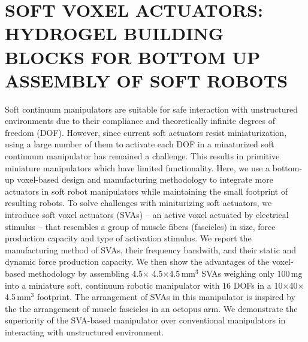 \graphicspath{{Images/SVAs/}}

\chapter{SOFT VOXEL ACTUATORS: HYDROGEL BUILDING BLOCKS FOR BOTTOM UP ASSEMBLY OF SOFT ROBOTS}
\label{chap:SVAs}
Soft continuum manipulators are suitable for safe interaction with unstructured environments due to their compliance and theoretically infinite degrees of freedom (DOF). However, since current soft actuators resist miniaturization, using a large number of them to activate each DOF in a minaturized soft continuum manipulator has remained a challenge. This results in primitive miniature manipulators which have limited functionality. Here, we use a bottom-up voxel-based design and manufacturing methodology to integrate more actuators in soft robot manipulators while maintaining the small footprint of resulting robots. To solve challenges with miniturizing soft actuators, we introduce soft voxel actuators (SVAs) -- an active voxel actuated by electrical stimulus -- that resembles a group of muscle fibers (fascicles) in size, force production capacity and type of activation stimulus. We report the manufacturing method of SVAs, their frequency bandwith, and their static and dynamic force production capacity. We then show the advantages of the voxel-based methodology by assembling 4.5$\times$ 4.5$\times$4.5\,mm$^3$ SVAs weighing only 100\,mg into a miniature soft, continuum robotic manipulator with 16 DOFs in a 10$\times$40$\times$4.5\,mm$^3$ footprint. The arrangement of SVAs in this manipulator is inspired by the the arrangement of muscle fascicles in an octopus arm. We demonstrate the superiority of the SVA-based manipulator over conventional manipulators in interacting with unstructured environment. 
